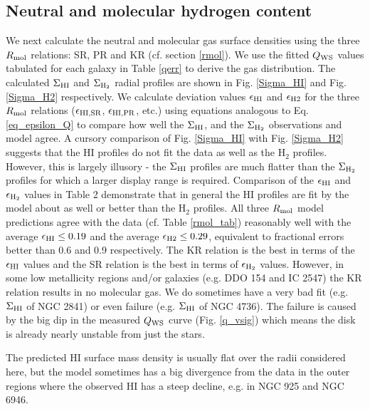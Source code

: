 \documentclass[12pt,preprint]{aastex}
\begin{document}
\subsection{Neutral and molecular hydrogen content}
\label{result_gas}
We next calculate the neutral and molecular gas surface densities using the three $R_{\rm mol}$ relations: SR, PR and KR (cf. section \ref{rmol}). We use the fitted $Q_{\rm WS}$ values tabulated for each galaxy in Table \ref{qerr} to derive the gas distribution.   The calculated $\Sigma_{\rm HI}$ and $\Sigma_{\rm H_2}$ radial profiles are shown in Fig. \ref{Sigma_HI} and Fig. \ref{Sigma_H2} respectively. 
We calculate deviation values $\epsilon_{\rm HI}$ and $\epsilon_{\rm H2}$ for the three $R_{\rm mol}$ relations ($\epsilon_{\rm HI,SR}$, $\epsilon_{\rm HI,PR}$, etc.) using equations analogous to Eq. \ref{eq_epsilon_Q} to compare how well the $\Sigma_{\rm HI}$, and the $\Sigma_{\rm H_2}$ observations and model agree. A cursory comparison of Fig. \ref{Sigma_HI} with Fig. \ref{Sigma_H2} suggests that the HI profiles do not fit the data as well as the H$_2$ profiles.  However, this is largely illusory - the $\Sigma_{\rm HI}$ profiles are much flatter than the $\Sigma_{\rm H_2}$ profiles for which a larger display range is required.  Comparison of the $\epsilon_{\rm HI}$ and $\epsilon_{\rm H_2}$ values in Table 2 demonstrate that in general the HI profiles are fit by the model about as well or better than the H$_2$ profiles.
All three $R_{\rm mol}$ model predictions agree with the data (cf. Table \ref{rmol_tab}) reasonably well with the average $\epsilon_{\rm HI} \leq 0.19$ and the average $\epsilon_{\rm H2} \leq 0.29$, equivalent to fractional errors better than 0.6 and 0.9 respectively. The KR relation is the best  in terms of the $\epsilon_{\rm HI}$ values  and the SR relation is the best in terms of $\epsilon_{\rm H_2}$ values.
However, in some low metallicity regions and/or galaxies (e.g. DDO 154 and IC 2547) the KR relation results in no molecular gas. 
We do sometimes have a very bad fit (e.g. $\Sigma_{\rm HI}$ of NGC 2841) or even failure (e.g. $\Sigma_{\rm HI}$ of NGC 4736). The failure is caused by the big dip in the measured $Q_{\rm WS}$ curve (Fig. \ref{q_vsig}) which means the disk is already nearly unstable from just the stars. 



The predicted HI surface mass density is usually flat over the radii
considered here, but the model sometimes has a big divergence from the data in the outer regions 
where the observed HI has a steep decline, e.g. in NGC 925 and NGC 6946.
\end{document}
